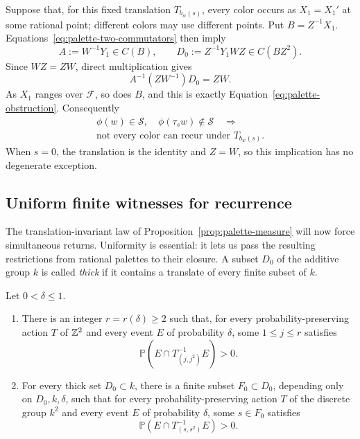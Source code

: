Suppose that, for this fixed translation $T_{b_w(s)}$, every color
occurs as $X_1=X_1'$ at some rational point; different colors may use
different points. Put $B=Z^{-1}X_1$. Equations~\ref{eq:palette-two-commutators}
then imply
\[
 A:=W^{-1}Y_1\in C(B),\qquad
 D_0:=Z^{-1}Y_1WZ\in C(BZ^2).
\]
Since $WZ=ZW$, direct multiplication gives
\[
 A^{-1}(ZW^{-1})D_0=ZW.
\]
As $X_1$ ranges over $\mathcal F$, so does $B$, and this is exactly
Equation~\ref{eq:palette-obstruction}. Consequently
\begin{equation}\label{eq:palette-return-obstruction}
 \begin{gathered}
 \phi(w)\in\mathcal S,\quad\phi(\tau_s w)\notin\mathcal S\quad\Longrightarrow\\
 \text{not every color can recur under }T_{b_w(s)}.
 \end{gathered}
\end{equation}
When $s=0$, the translation is the identity and $Z=W$, so this implication
has no degenerate exception.

\subsection{Uniform finite witnesses for recurrence}

The translation-invariant law of Proposition~\ref{prop:palette-measure} will now
force simultaneous returns. Uniformity is essential: it lets us pass
the resulting restrictions from rational palettes to their closure.
A subset $D_0$ of the additive group $k$ is called \emph{thick} if it
contains a translate of every finite subset of $k$.

\begin{lemma}\label{lem:palette-uniform-recurrence}
Let $0<\delta\leq1$.
\begin{enumerate}[label=\textup{(\roman*)}]
\item There is an integer $r=r(\delta)\geq2$ such that, for every
probability-preserving action $T$ of $\mathbb Z^2$ and every event $E$ of
probability $\delta$, some $1\leq j\leq r$ satisfies
\[
 \mathbb P(E\cap T_{(j,j^2)}^{-1}E)>0.
\]
\item For every thick set $D_0\subset k$, there is a finite subset
$F_0\subset D_0$, depending only on $D_0,k,\delta$, such that for every
probability-preserving action $T$ of the discrete group $k^2$ and every
event $E$ of probability $\delta$, some $s\in F_0$ satisfies
\[
 \mathbb P(E\cap T_{(s,s^2)}^{-1}E)>0.
\]
\end{enumerate}
\end{lemma}

